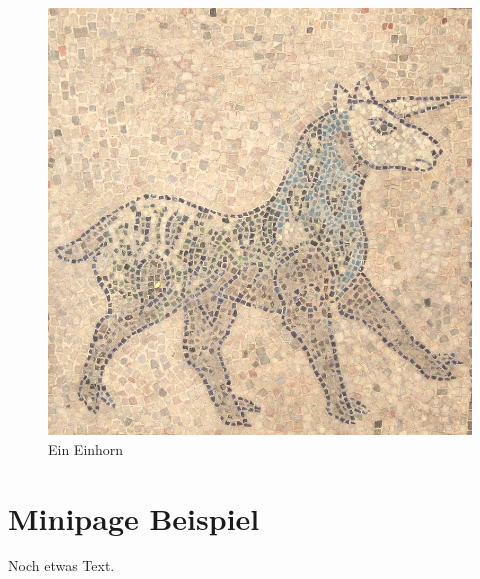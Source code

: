 \documentclass[]{scrreprt}
\begin{document}
\begin{figure}[h]
\centering
\includegraphics[scale=0.2]{einhorn.jpg}
\caption{Ein Einhorn}
\label{fig:einhorn}
\end{figure}

\section{Minipage Beispiel}

Noch etwas Text.
\end{document}
